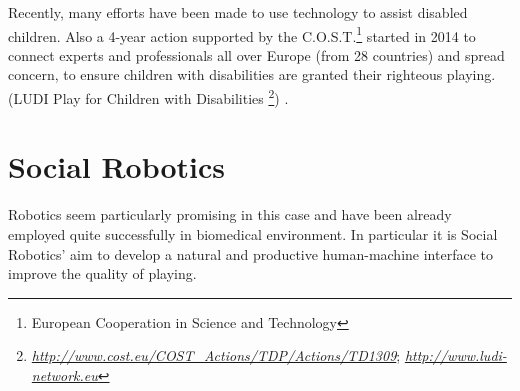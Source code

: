\documentclass[a4paper,twoside]{book}
\begin{document}
Recently, many efforts have been made to use technology to assist disabled children. Also a 4-year action supported by the C.O.S.T.\footnote{European Cooperation in Science and Technology} started in 2014 to connect experts and professionals all over Europe (from 28 countries) and spread concern, to ensure children with disabilities are granted their righteous playing. (LUDI \textemdash Play for Children with Disabilities \footnote{\textit\underline{http://www.cost.eu/COST\_Actions/TDP/Actions/TD1309}; \textit\underline{http://www.ludi-network.eu}}) \cite{art3}.

\section{Social Robotics}
Robotics seem particularly promising in this case and have been already employed quite successfully in biomedical environment. In particular it is Social Robotics' aim to develop a natural and productive human-machine interface to improve the quality of playing.
 
\end{document}
